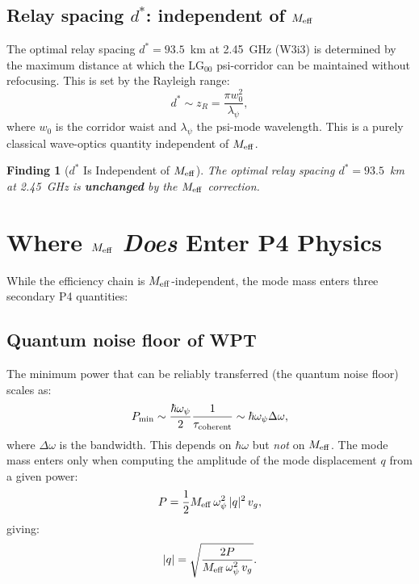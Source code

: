 \documentclass[11pt]{article}
\newtheorem{finding}{Finding}
\newcommand{\Meff}{M_{\rm eff}}
\begin{document}
\subsection{Relay spacing $d^*$: independent of $\Meff$}

The optimal relay spacing $d^* = 93.5$~km at 2.45~GHz (W3i3) is determined
by the maximum distance at which the LG$_{00}$ psi-corridor can be maintained
without refocusing. This is set by the Rayleigh range:
\begin{equation}
d^* \sim z_R = \frac{\pi w_0^2}{\lambda_\psi},
\label{eq:dstar-Rayleigh}
\end{equation}
where $w_0$ is the corridor waist and $\lambda_\psi$ the psi-mode wavelength.
This is a purely classical wave-optics quantity independent of $\Meff$.

\begin{finding}[$d^*$ Is Independent of $\Meff$]
\label{find:dstar-Meff}
The optimal relay spacing $d^* = 93.5$~km at 2.45~GHz is \textbf{unchanged}
by the $\Meff$ correction.
\end{finding}

\section{Where $\Meff$ \emph{Does} Enter P4 Physics}
\label{sec:P4-Meff-enters}

While the efficiency chain is $\Meff$-independent, the mode mass enters
three secondary P4 quantities:

\subsection{Quantum noise floor of WPT}

The minimum power that can be reliably transferred (the quantum noise floor)
scales as:
\begin{equation}
P_{\rm min} \sim \frac{\hbar\omega_\psi}{2}\frac{1}{\tau_{\rm coherent}}
\sim \hbar\omega_\psi \Delta\omega,
\label{eq:Pmin-quantum}
\end{equation}
where $\Delta\omega$ is the bandwidth. This depends on $\hbar\omega$ but
\emph{not} on $\Meff$. The mode mass enters only when computing the
amplitude of the mode displacement $q$ from a given power:
\begin{equation}
P = \frac{1}{2}\Meff\,\omega_\psi^2\,|q|^2\,v_g,
\label{eq:P-from-q}
\end{equation}
giving:
\begin{equation}
|q| = \sqrt{\frac{2P}{\Meff\,\omega_\psi^2\,v_g}}.
\label{eq:q-from-P}
\end{equation}
\end{document}
